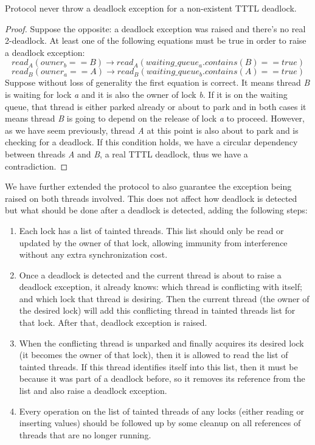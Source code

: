 \begin{lemma}
Protocol never throw a deadlock exception for a non-existent TTTL deadlock.
\end{lemma}
\begin{proof}
Suppose the opposite: a deadlock exception was raised and there's no real 2-deadlock. At least one of the following equations must be true in order to raise a deadlock exception:
\begin{equation}
read_{A}(owner_{b} == B) \rightarrow read_{A}(waiting\_queue_{a}.contains(B) == true)
\end{equation}
\begin{equation}
read_{B}(owner_{a} == A) \rightarrow read_{B}(waiting\_queue_{b}.contains(A) == true)
\end{equation}
Suppose without loss of generality the first equation is correct.
It means thread \emph{B} is waiting for lock \emph{a} and it is also the owner of lock \emph{b}.
If it is on the waiting queue, that thread is either parked already or about to park
and in both cases it means thread \emph{B} is going to depend on the release of lock \emph{a} to proceed.
However, as we have seem previously, thread \emph{A} at this point is also about to park and is checking for a deadlock.
If this condition holds, we have a circular dependency between threads \emph{A} and \emph{B}, a real TTTL deadlock, thus we have a contradiction.
\end{proof}

We have further extended the protocol to also guarantee the exception being raised on both threads involved. This does not affect how deadlock is detected but what should be done after a deadlock is detected, adding the following steps:

\begin{enumerate}
\item Each lock has a list of tainted threads. This list should only be read or updated by the owner of that lock, allowing immunity from interference without any extra synchronization cost.
\item Once a deadlock is detected and the current thread is about to raise a deadlock exception, it already knows: which thread is conflicting with itself; and which lock that thread is desiring. Then the current thread (the owner of the desired lock) will add this conflicting thread in tainted threads list for that lock. After that, deadlock exception is raised.
\item When the conflicting thread is unparked and finally acquires its desired lock (it becomes the owner of that lock), then it is allowed to read the list of tainted threads. If this thread identifies itself into this list, then it must be because it was part of a deadlock before, so it removes its reference from the list and also raise a deadlock exception.
\item Every operation on the list of tainted threads of any locks (either reading or inserting values) should be followed up by some cleanup on all references of threads that are no longer running.
\end{enumerate}


